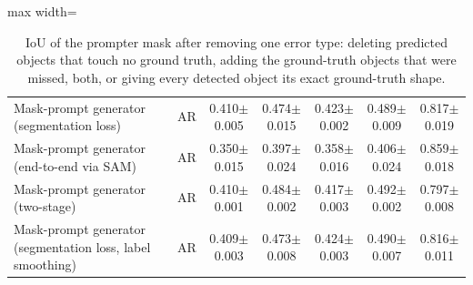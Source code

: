 \begin{table}[htbp]
\begin{adjustbox}{max width=\linewidth}
\begin{tabular}{llccccc}
Mask-prompt generator (segmentation loss) & AR & 0.410$\pm$0.005 & 0.474$\pm$0.015 & 0.423$\pm$0.002 & 0.489$\pm$0.009 & 0.817$\pm$0.019 \\
Mask-prompt generator (end-to-end via SAM) & AR & 0.350$\pm$0.015 & 0.397$\pm$0.024 & 0.358$\pm$0.016 & 0.406$\pm$0.024 & 0.859$\pm$0.018 \\
Mask-prompt generator (two-stage) & AR & 0.410$\pm$0.001 & 0.484$\pm$0.002 & 0.417$\pm$0.003 & 0.492$\pm$0.002 & 0.797$\pm$0.008 \\
Mask-prompt generator (segmentation loss, label smoothing) & AR & 0.409$\pm$0.003 & 0.473$\pm$0.008 & 0.424$\pm$0.003 & 0.490$\pm$0.007 & 0.816$\pm$0.011 \\
\bottomrule
\end{tabular}
\end{adjustbox}
\caption{IoU of the prompter mask after removing one error type: deleting predicted objects that touch no ground truth, adding the ground-truth objects that were missed, both, or giving every detected object its exact ground-truth shape.}
\label{tab:decomposition_infused_mlp05}
\end{table}
